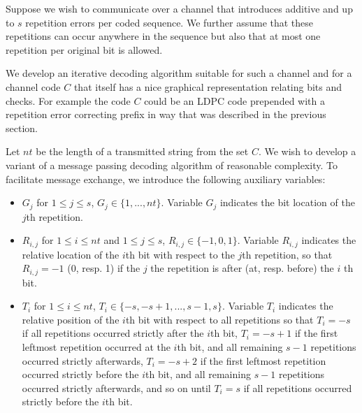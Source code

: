 Suppose we wish to communicate over a channel that introduces
additive and up to $s$ repetition errors per coded sequence. We
further assume that these repetitions can occur anywhere in the
sequence but also that at most one repetition per original bit is
allowed.

We develop an iterative decoding algorithm suitable for such a
channel and for a channel code $C$ that itself has a nice graphical
representation relating bits and checks. For example the code $C$
could be an LDPC code prepended with a repetition error correcting
prefix in way that was described in the previous section.

Let $nt$ be the length of a transmitted string from the set $C$. We
wish to develop a variant of a message passing decoding algorithm of
reasonable complexity. To facilitate message exchange, we introduce
the following auxiliary variables:
\begin{itemize}
\item $G_j$ for $1 \leq j \leq s$, $G_j \in \{1,...,nt\}$.
Variable $G_j$ indicates the bit location of the $j$th repetition.
 \item $R_{i,j}$ for $1\leq i \leq nt$ and $1 \leq j \leq s$, $R_{i,j} \in \{-1,0,1\}$. Variable $R_{i,j}$ indicates the relative
 location of the $i$th bit with respect to the $j$th repetition, so that $R_{i,j}=-1$ (0, resp. 1) if the
 $j$ the repetition is after (at, resp. before) the $i$ th bit.\item
 $T_i$ for  $1\leq i \leq nt$, $T_i \in \{-s,-s+1,...,s-1,s\}$.
 Variable $T_i$ indicates the relative position of the $i$th bit with respect to all
 repetitions so that $T_i=-s$ if all repetitions occurred strictly after the
 $i$th bit,  $T_i=-s+1$ if the first leftmost repetition occurred at the
 $i$th bit, and all remaining $s-1$ repetitions occurred
 strictly afterwards, $T_i=-s+2$ if the first leftmost repetition occurred
 strictly before the
 $i$th bit, and all remaining $s-1$ repetitions occurred
 strictly afterwards, and so on until $T_i=s$ if all repetitions occurred strictly before the
 $i$th bit.
\end{itemize}

